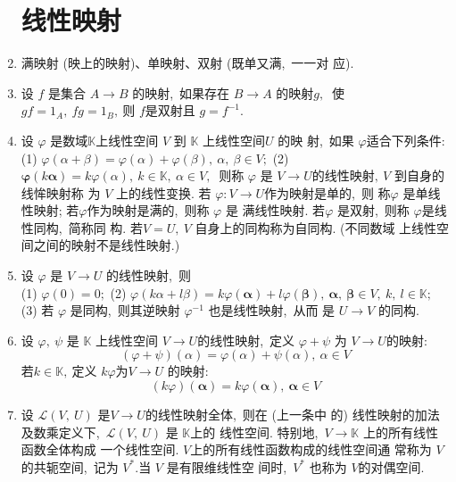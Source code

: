 \begin{enumerate}
		\section{线性映射}
		\item 满映射 (映上的映射)、单映射、双射 (既单又满,\ 一一对 应).
		\item 设  $f$  是集合  $A \rightarrow B $ 的映射,\ 如果存在  $B \rightarrow A $ 的映射$  g ,\ $ 使 $ g f=1_{A},\  f g=1_{B} ,\  $则 $ f  $是双射且 $ g=f^{-1} .$
		\item 设 $ \varphi $ 是数域$  \mathbb{K}  $上线性空间  $V $ 到  $\mathbb{K}$  上线性空间$  U$  的映 射,\  如果  $\varphi  $适合下列条件:\\
		(1) $ \varphi(\alpha+\beta)=\varphi(\alpha)+\varphi(\beta),\  \alpha,\  \beta \in V ;$
		(2) $ \boldsymbol{\varphi}(k \boldsymbol{\alpha})=k \varphi(\alpha),\  k \in \mathbb{K},\  \alpha \in V ,\ $
		则称 $ \varphi $ 是 $ V \rightarrow U  $的线性映射$,\   V$  到自身的线恈映射称 为 $ V$  上的线性变换. 若 $ \varphi: V \rightarrow U  $作为映射是单的,\  则 称$  \varphi $ 是单线性映射; 若$  \varphi  $作为映射是满的,\  则称  $\varphi$  是 满线性映射. 若$  \varphi $ 是双射,\  则称  $\varphi  $是线性同构,\  简称同 构. 若$  V=U,\  V$  自身上的同构称为自同构. (不同数域 上线性空间之间的映射不是线性映射.)
		\item 设  $\varphi $ 是  $V \rightarrow U$  的线性映射,\ 则\\
		(1) $ \varphi(0)=0 ;$
		(2) $ \varphi(k \alpha+l \beta)=k \varphi(\boldsymbol{\alpha})+l \varphi(\boldsymbol{\beta}),\  \boldsymbol{\alpha},\  \boldsymbol{\beta} \in V,\  k,\  l \in \mathbb{K} ;$\\
		(3) 若  $\varphi$  是同构,\  则其逆映射 $ \varphi^{-1}$  也是线性映射,\  从而 是 $ U \rightarrow V$  的同构.
		\item 设 $ \varphi,\  \psi $ 是  $\mathbb{K}$  上线性空间 $ V \rightarrow U  $的线性映射,\ 定义 $ \varphi+\psi $ 为 $ V \rightarrow U  $的映射:
		$$(\varphi+\psi)(\alpha)=\varphi(\alpha)+\psi(\alpha),\  \alpha \in V$$
		若$  k \in \mathbb{K} ,\ $定义 $ k \varphi  $为$  V \rightarrow U $ 的映射:
		$$(k \varphi)(\boldsymbol{\alpha})=k \varphi(\boldsymbol{\alpha}),\  \boldsymbol{\alpha} \in V$$
		\item 设  $\mathcal{L}(V,\  U)$ 是$  V \rightarrow U  $的线性映射全体,\  则在 (上一条中 的) 线性映射的加法及数乘定义下,\ $  \mathcal{L}(V,\  U) $ 是  $\mathbb{K}  $上的 线性空间. 特别地,\   $V \rightarrow \mathbb{K} $ 上的所有线性函数全体构成 一个线性空间. $ V  $上的所有线性函数构成的线性空间通 常称为  $V $ 的共轭空间,\  记为 $ V^{*} . $当  $V $ 是有限维线性空 间时,\   $V^{*} $ 也称为  $V  $的对偶空间.

\end{enumerate}
